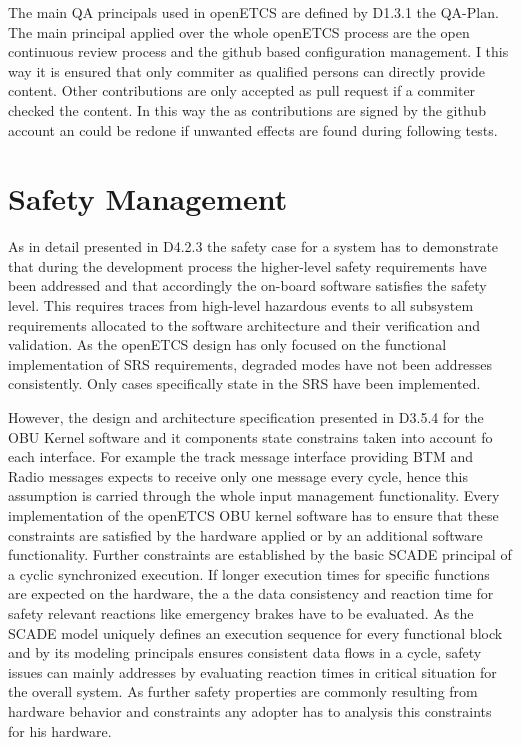 \documentclass{template/openetcs_report}
\begin{document}
The main QA principals used in openETCS are defined by D1.3.1 the QA-Plan. The main principal applied over the whole openETCS process are the open continuous review process and the github based configuration management. I this way it is ensured that only commiter as qualified persons can directly provide content. Other contributions are only accepted as pull request if a commiter checked the content. In this way the as contributions are signed by the github account an could be redone if unwanted effects are found during following tests.

\section{Safety Management}

As in detail presented in D4.2.3 the safety case for a system has to demonstrate that during the development process the higher-level safety requirements have been addressed and that accordingly the on-board software satisfies the safety level. This requires traces from high-level hazardous events to all subsystem requirements allocated to the software architecture and their verification and validation. 
As the openETCS design has only focused on the functional implementation of SRS requirements, degraded modes have not been addresses consistently. Only cases specifically state in the SRS have been implemented.

However, the design and architecture specification presented in D3.5.4 for the OBU Kernel software and it components state constrains taken into account fo each interface. For example the track message interface providing BTM and Radio messages expects to receive only one message every cycle, hence this assumption is carried through the whole input management functionality. Every implementation of the openETCS OBU kernel software has to ensure that these constraints are satisfied by the hardware applied or by an additional software functionality. Further constraints are established by the basic SCADE principal of a cyclic synchronized execution. If longer execution times for specific functions are expected on the hardware, the a the data consistency and reaction time for safety relevant reactions like emergency brakes have to be evaluated. As the SCADE model uniquely defines an execution sequence for every functional block and by its modeling principals ensures consistent data flows in a cycle, safety issues can mainly addresses by evaluating reaction times in critical situation for the overall system. As further safety properties are commonly resulting from hardware behavior and constraints any adopter has to analysis this constraints for his hardware.
\end{document}

